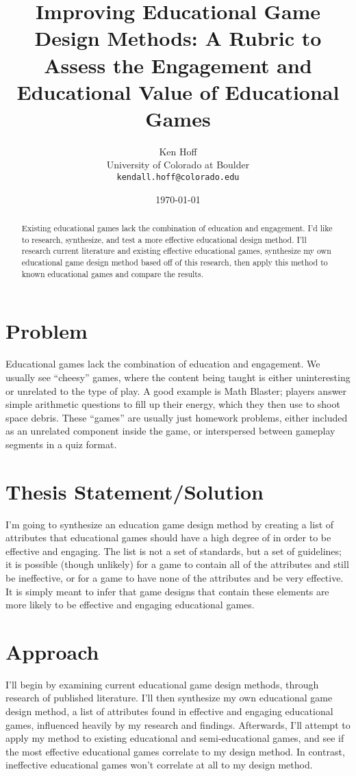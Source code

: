 \documentclass[12pt]{report}
\author{Ken Hoff \\ University of Colorado at Boulder \\ \texttt{kendall.hoff@colorado.edu}}
\date{\today}
\title{Improving Educational Game Design Methods: A Rubric to Assess the Engagement and Educational Value of Educational Games
}
\begin{document}
\maketitle

\begin{abstract}

Existing educational games lack the combination of education and engagement. I'd like to research, synthesize, and test a more effective educational design method. I'll research current literature and existing effective educational games, synthesize my own educational game design method based off of this research, then apply this method to known educational games and compare the results.

\end{abstract}

\tableofcontents

\section{Problem}
	Educational games lack the combination of education and engagement. We usually see “cheesy” games, where the content being taught is either uninteresting or unrelated to the type of play. A good example is Math Blaster; players answer simple arithmetic questions to fill up their energy, which they then use to shoot space debris. These “games” are usually just homework problems, either included as an unrelated component inside the game, or interspersed between gameplay segments in a quiz format.

\section{Thesis Statement/Solution}
	I'm going to synthesize an education game design method by creating a list of attributes that educational games should have a high degree of in order to be effective and engaging. The list is not a set of standards, but a set of guidelines; it is possible (though unlikely) for a game to contain all of the attributes and still be ineffective, or for a game to have none of the attributes and be very effective. It is simply meant to infer that game designs that contain these elements are more likely to be effective and engaging educational games.

\section{Approach} 
	I'll begin by examining current educational game design methods, through research of published literature. I'll then synthesize my own educational game design method, a list of attributes found in effective and engaging educational games, influenced heavily by my research and findings. Afterwards, I'll attempt to apply my method to existing educational and semi-educational games, and see if the most effective educational games correlate to my design method. In contrast, ineffective educational games won't correlate at all to my design method.
\end{document}
